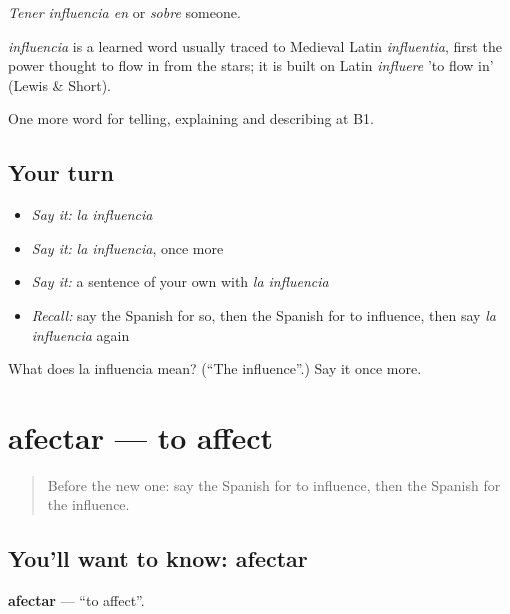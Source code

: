 \emph{Tener influencia en} or \emph{sobre} someone.

\begin{cousinweb}
\emph{influencia} is a learned word usually traced to Medieval Latin \emph{influentia}, first the power thought to flow in from the stars; it is built on Latin \emph{influere} 'to flow in' (Lewis \& Short).
\end{cousinweb}

\begin{grammarlens}[title={What you've built}]
One more word for telling, explaining and describing at B1.
\end{grammarlens}

\subsection*{Your turn}
\begin{itemize}
\raggedright
  \item \emph{Say it:} \emph{la influencia}
  \item \emph{Say it:} \emph{la influencia}, once more
  \item \emph{Say it:} a sentence of your own with \emph{la influencia}
  \item \emph{Recall:} say the Spanish for so, then the Spanish for to influence, then say \emph{la influencia} again
\end{itemize}

\begin{tcolorbox}[breakable,colback=teal!4,colframe=teal!35!black,title={Before you move on}]
What does la influencia mean? (\textquotedblleft{}The influence\textquotedblright{}.) Say it once more.
\end{tcolorbox}
\section[afectar]{afectar — to affect}

\label{lesson:ES-C583-afectar}



\begin{quote}
Before the new one: say the Spanish for to influence, then the Spanish for the influence.
\end{quote}

\subsection*{You'll want to know: afectar}
\textbf{afectar} — \textquotedblleft{}to affect\textquotedblright{}.

